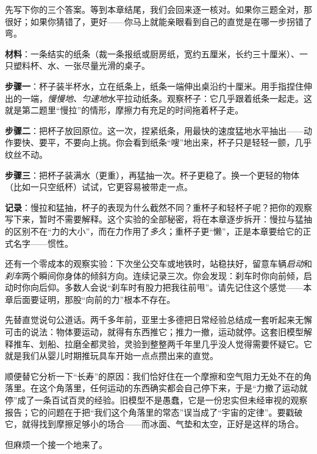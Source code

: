 先写下你的三个答案。等到本章结尾，我们会回来逐一核对。如果你三题全对，那很好；如果你猜错了，更好——你马上就能亲眼看到自己的直觉是在哪一步拐错了弯。


\begin{experiment}
\textbf{材料}：一条结实的纸条（裁一条报纸或厨房纸，宽约五厘米，长约三十厘米）、一只塑料杯、水、一张尽量光滑的桌子。

\textbf{步骤一}：杯子装半杯水，立在纸条上，纸条一端伸出桌沿约十厘米。用手指捏住伸出的一端，\emph{慢慢地、匀速地}水平拉动纸条。观察杯子：它几乎跟着纸条一起走。这就是第二题里“慢拉”的情形，摩擦力有充足的时间拖着杯子走。

\textbf{步骤二}：把杯子放回原位。这一次，捏紧纸条，用最快的速度猛地水平抽出——动作要快、要平，不要向上挑。你会看到纸条“嗖”地出来，杯子只是轻轻一颤，几乎纹丝不动。

\textbf{步骤三}：把杯子装满水（更重），再猛抽一次。杯子更稳了。换一个更轻的物体（比如一只空纸杯）试试，它更容易被带走一点。

\textbf{记录}：慢拉和猛抽，杯子的表现为什么截然不同？重杯子和轻杯子呢？把你的观察写下来，暂时不需要解释。这个实验的全部秘密，将在本章逐步拆开：慢拉与猛抽的区别不在“力的大小”，而在力作用了\emph{多久}；重杯子更“懒”，正是本章要给它的正式名字——惯性。
\end{experiment}

还有一个零成本的观察实验：下次坐公交车或地铁时，站稳扶好，留意车辆\emph{启动}和\emph{刹车}两个瞬间你身体的倾斜方向。连续记录三次。你会发现：刹车时你向前倾，启动时你向后仰。多数人会说“刹车时有股力把我往前甩”。请先记住这个感觉——本章后面要证明，那股“向前的力”根本不存在。


先替直觉说句公道话。两千多年前，亚里士多德把日常经验总结成一套听起来无懈可击的说法：物体要运动，就得有东西推它；推力一撤，运动就停。这套旧模型解释推车、划船、拉磨全都灵验，灵验到整整两千年里几乎没人觉得需要怀疑它。它就是我们从婴儿时期推玩具车开始一点点攒出来的直觉。

顺便替它分析一下“长寿”的原因：我们恰好住在一个摩擦和空气阻力无处不在的角落里。在这个角落里，任何运动的东西确实都会自己停下来，于是“力撤了运动就停”成了一条百试百灵的经验。旧模型不是愚蠢，它是一份忠实但未经审视的观察报告；它的问题在于把“我们这个角落里的常态”误当成了“宇宙的定律”。要戳破它，就得找到摩擦足够小的场合——而冰面、气垫和太空，正好是这样的场合。

但麻烦一个接一个地来了。

